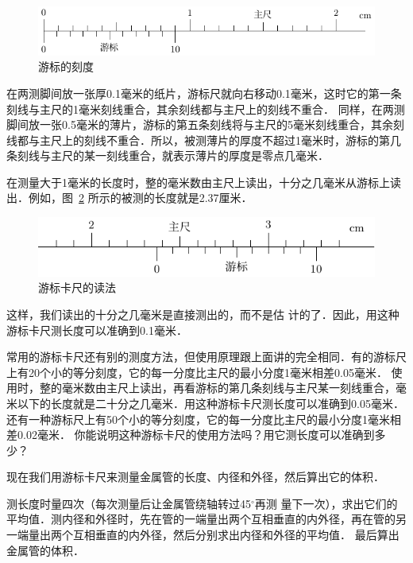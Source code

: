 \begin{figure}[htbp]
    \centering
    \includegraphics{fig/A/10-2.pdf}
    \caption{游标的刻度}\label{fig_A_10-2}
\end{figure}

在两测脚间放一张厚0.1毫米的纸片，游标尺就向右移动0.1毫米，这时它的第一条刻线与主尺的1毫米刻线重合，其余刻线都与主尺上的刻线不重合．
同样，在两测脚间放一张0.5毫米的薄片，游标的第五条刻线将与主尺的5毫米刻线重合，其余刻线都与主尺上的刻线不重合．所以，被测薄片的厚度不超过1毫米时，游标的第几条刻线与主尺的某一刻线重合，就表示薄片的厚度是零点几毫米．

在测量大于1毫米的长度时，整的毫米数由主尺上读出，十分之几毫米从游标上读出．例如，图~\ref{fig_A_10-3} 所示的被测的长度就是2.37厘米．
	
\begin{figure}[htbp]
    \centering
    \includegraphics{fig/A/10-3.pdf}
    \caption{游标卡尺的读法}\label{fig_A_10-3}
\end{figure}	


这样，我们读出的十分之几毫米是直接测出的，而不是估
计的了．因此，用这种游标卡尺测长度可以准确到0.1毫米．


常用的游标卡尺还有别的测度方法，但使用原理跟上面讲的完全相同．有的游标尺上有20个小的等分刻度，它的每一分度比主尺的最小分度1毫米相差0.05毫米．
使用时，整的毫米数由主尺上读出，再看游标的第几条刻线与主尺某一刻线重合，毫米以下的长度就是二十分之几毫米．用这种游标卡尺测长度可以准确到0.05毫米．还有一种游标尺上有50个小的等分刻度，它的每一分度比主尺的最小分度1毫米相差0.02毫米．
你能说明这种游标卡尺的使用方法吗？用它测长度可以准确到多少？

现在我们用游标卡尺来测量金属管的长度、内径和外径，然后算出它的体积．

测长度时量四次（每次测量后让金属管绕轴转过45$^\circ$再测
量下一次），求出它们的平均值．测内径和外径时，先在管的一端量出两个互相垂直的内外径，再在管的另一端量出两个互相垂直的内外径，然后分别求出内径和外径的平均值．
最后算出金属管的体积．

